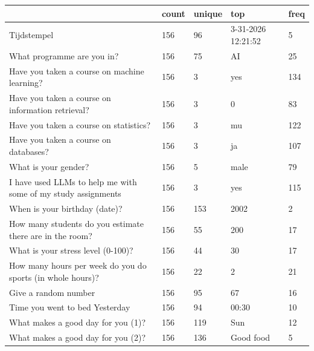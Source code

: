 \begin{tabular}{lllll}
\toprule
 & count & unique & top & freq \\
\midrule
Tijdstempel & 156 & 96 & 3-31-2026 12:21:52 & 5 \\
What programme are you in? & 156 & 75 & AI & 25 \\
Have you taken a course on machine learning? & 156 & 3 & yes & 134 \\
Have you taken a course on information retrieval? & 156 & 3 & 0 & 83 \\
Have you taken a course on statistics? & 156 & 3 & mu & 122 \\
Have you taken a course on databases? & 156 & 3 & ja & 107 \\
What is your gender? & 156 & 5 & male & 79 \\
I have used LLMs to help me with some of my study assignments  & 156 & 3 & yes & 115 \\
When is your birthday (date)? & 156 & 153 & 2002 & 2 \\
How many students do you estimate there are in the room? & 156 & 55 & 200 & 17 \\
What is your stress level (0-100)? & 156 & 44 & 30 & 17 \\
How many hours per week do you do sports (in whole hours)?  & 156 & 22 & 2 & 21 \\
Give a random number & 156 & 95 & 67 & 16 \\
Time you went to bed Yesterday & 156 & 94 & 00:30 & 10 \\
What makes a good day for you (1)? & 156 & 119 & Sun & 12 \\
What makes a good day for you (2)? & 156 & 136 & Good food & 5 \\
\bottomrule
\end{tabular}

